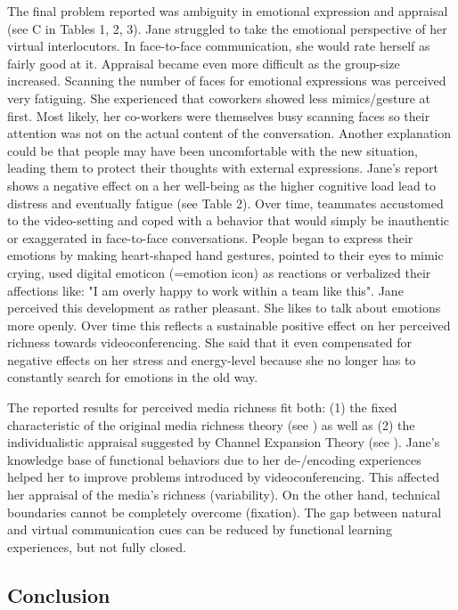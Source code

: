 \documentclass[man]{apa7}
\begin{document}
The final problem reported was ambiguity in emotional expression and appraisal (see C in Tables 1, 2, 3). Jane struggled to take the emotional perspective of her virtual interlocutors. In face-to-face communication, she would rate herself as fairly good at it. Appraisal became even more difficult as the group-size increased. Scanning the number of faces for emotional expressions was perceived very fatiguing. She experienced that coworkers showed less mimics/gesture at first. Most likely, her co-workers were themselves busy scanning faces so their attention was not on the actual content of the conversation. Another explanation could be that people may have been uncomfortable with the new situation, leading them to protect their thoughts with external expressions. Jane's report shows a negative effect on a her well-being as the higher cognitive load lead to distress and eventually fatigue (see Table 2). Over time, teammates accustomed to the video-setting and coped with a behavior that would simply be inauthentic or exaggerated in face-to-face conversations. People began to express their emotions by making heart-shaped hand gestures, pointed to their eyes to mimic crying, used digital emoticon (=emotion icon) as reactions or verbalized their affections like: "I am overly happy to work within a team like this". Jane perceived this development as rather pleasant. She likes to talk about emotions more openly. Over time this reflects a sustainable positive effect on her perceived richness towards videoconferencing. She said that it even compensated for negative effects on her stress and energy-level because she no longer has to constantly search for emotions in the old way.

The reported results for perceived media richness fit both: (1) the fixed characteristic of the original media richness theory (see \cite{daft1983information}) as well as (2) the individualistic appraisal suggested by Channel Expansion Theory (see \cite{Carlson1999}). Jane's knowledge base of functional behaviors due to her de-/encoding experiences helped her to improve problems introduced by videoconferencing. This affected her appraisal of the media's richness (variability). On the other hand, technical boundaries cannot be completely overcome (fixation). The gap between natural and virtual communication cues can be reduced by functional learning experiences, but not fully closed.

\subsection{Conclusion}
\end{document}
